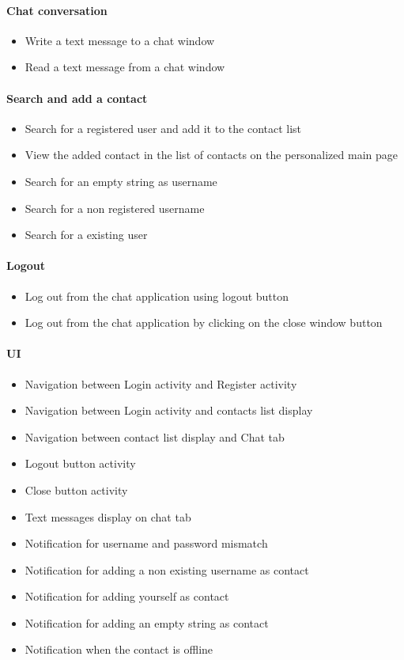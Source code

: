 \documentclass[finalReport.tex]{subfiles}
\begin{document}
\paragraph{Chat conversation}
\begin{itemize}
\item{Write a text message to a chat window}
\item{Read a text message from a chat window}
\end{itemize}

\paragraph{Search and add a contact}

\begin{itemize}
\item{Search for a registered user and add it to the contact list}
\item{View the added contact in the list of contacts on the personalized main page}
\item{Search for an empty string as username}
\item{Search for a non registered username}
\item{Search for a existing user}
\end{itemize}

\paragraph{Logout}
\begin{itemize}
\item{Log out from the chat application using logout button}
\item{Log out from the chat application by clicking on the close window button}
\end{itemize}

\paragraph{UI} 

\begin{itemize}
\item{Navigation between Login activity and Register activity}
\item{Navigation between Login activity and contacts list display}
\item{Navigation between contact list display and Chat tab}
\item{Logout button activity}
\item{Close button activity}
\item{Text messages display on chat tab}
\item{Notification for username and password mismatch}
\item{Notification for adding a non existing username as contact}
\item{Notification for adding yourself as contact}
\item{Notification for adding an empty string as contact}
\item{Notification when the contact is offline}
\end{itemize}
\end{document}
